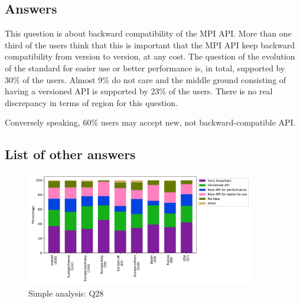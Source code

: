 
\subsection{Answers}


This question is about backward compatibility of the MPI API. More than one
third of the users think that this is important that the MPI API keep backward
compatibility from version to version, at any cost. The question of the evolution of the
standard for easier use or better performance is, in total, supported by 30\%
of the users. Almost 9\% do not care and the middle ground consisting of having
a versioned API is supported by 23\% of the users. There is no real discrepancy in
terms of region for this question.

Conversely speaking, 60\% users may accept new, not backward-compatible API.

\subsection{List of other answers}
\begin{itemize}

\end{itemize}

\begin{figure}[htb]
\begin{center}
\includegraphics[width=10cm]{../pdfs/Q28.pdf}
\caption{Simple analysis: Q28}
\label{fig:Q28}
\end{center}
\end{figure}
